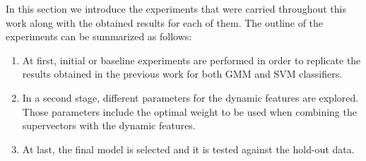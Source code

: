 
In this section we introduce the experiments that were carried throughout this work
along with the obtained results for each of them. The outline of the experiments can be
summarized as follows:

\begin{enumerate}
	\item At first, initial or baseline
	experiments are performed in order to replicate the results
	obtained in the previous work \cite{main} for both GMM and SVM classifiers.
	\item In a second stage, different parameters for the dynamic features are explored.
	Those parameters include the optimal weight to be used when combining the
	supervectors with the dynamic features.
	\item At last, the final model is selected and it is tested against the hold-out data.
\end{enumerate}





